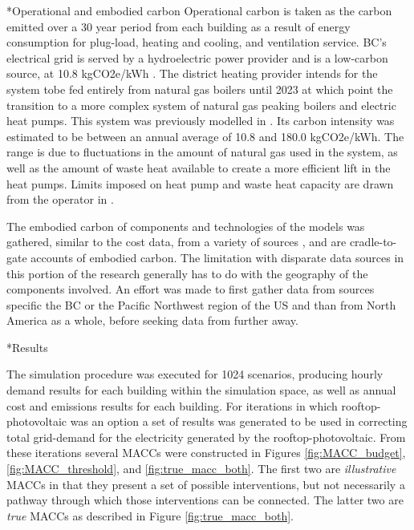 \documentclass[twocolumn, a4paper,10pt]{article}
\makeatletter
\renewcommand\section{\@startsection{section}{1}{\z@}{3pt}{3pt}{\normalfont\large\bfseries}}
\renewcommand\subsection{\@startsection{subsection}{1}{\z@}{\z@}{\z@}{\normalfont\normalsize\bfseries}}
\renewcommand\subsection{\@startsection{subsection}{1}{\z@}{\z@}{0.1pt}{\normalfont\normalsize\bfseries}}
\makeatother
\begin{document}
\subsection*{Operational and embodied carbon}
Operational carbon is taken as the carbon emitted over a 30 year period from each building as a result of energy consumption for plug-load, heating and cooling, and ventilation service. BC's electrical grid is served by a hydroelectric power provider and is a low-carbon source, at 10.8 kgCO2e/kWh \citep{bc_ministry_of_envrionmetn_and_climate_change_strategy_bc_2019}. The district heating provider intends for the system tobe  fed entirely from natural gas boilers until 2023 at which point the transition to a more complex system of natural gas peaking boilers and electric heat pumps. This system was previously modelled in \citet{mccarty_accepted_2020}. Its carbon intensity was estimated to be between an annual average of 10.8 and 180.0 kgCO2e/kWh. The range is due to fluctuations in the amount of natural gas used in the system, as well as the amount of waste heat available to create a more efficient lift in the heat pumps. Limits imposed on heat pump and waste heat capacity are drawn from the operator in \citet{noauthor_infrastructure_2014}.

The embodied carbon of components and technologies of the models was gathered, similar to the cost data, from a variety of sources \citep{jones_ice_2019, droguett_embodied_2019,c-change_labs_embodied_2020}, and are cradle-to-gate accounts of embodied carbon. The limitation with disparate data sources in this portion of the research generally has to do with the geography of the components involved. An effort was made to first gather data from sources specific the BC or the Pacific Northwest region of the US and than from North America as a whole, before seeking data from further away. 

\section*{Results}

The simulation procedure was executed for 1024 scenarios, producing hourly demand results for each building within the simulation space, as well as annual cost and emissions results for each building. For iterations in which rooftop-photovoltaic was an option a set of results was generated to be used in correcting total grid-demand for the electricity generated by the rooftop-photovoltaic. From these iterations several MACCs were constructed in Figures \ref{fig:MACC_budget}, \ref{fig:MACC_threshold}, and \ref{fig:true_macc_both}. The first two are \textit{illustrative} MACCs in that they present a set of possible interventions, but not necessarily a pathway through which those interventions can be connected. The latter two are \textit{true} MACCs as described in Figure \ref{fig:true_macc_both}.
\end{document}
